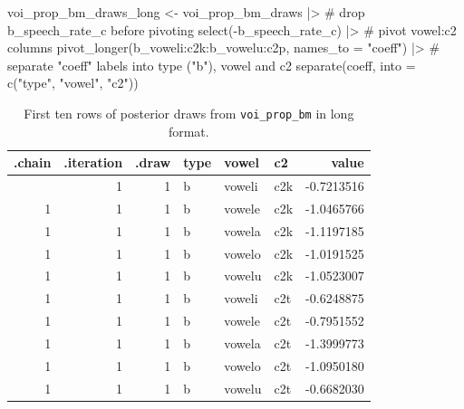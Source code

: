 \documentclass[
  authoryear,
  preprint,
  3p]{elsarticle}
\newenvironment{Shaded}{\begin{snugshade}}{\end{snugshade}}
\newcommand{\AttributeTok}[1]{\textcolor[rgb]{0.40,0.45,0.13}{#1}}
\newcommand{\CommentTok}[1]{\textcolor[rgb]{0.37,0.37,0.37}{#1}}
\newcommand{\FunctionTok}[1]{\textcolor[rgb]{0.28,0.35,0.67}{#1}}
\newcommand{\NormalTok}[1]{\textcolor[rgb]{0.00,0.23,0.31}{#1}}
\newcommand{\OtherTok}[1]{\textcolor[rgb]{0.00,0.23,0.31}{#1}}
\newcommand{\SpecialCharTok}[1]{\textcolor[rgb]{0.37,0.37,0.37}{#1}}
\newcommand{\StringTok}[1]{\textcolor[rgb]{0.13,0.47,0.30}{#1}}
\begin{document}
\begin{Shaded}
\begin{Highlighting}[]
\NormalTok{voi\_prop\_bm\_draws\_long }\OtherTok{\textless{}{-}}\NormalTok{ voi\_prop\_bm\_draws }\SpecialCharTok{|\textgreater{}} 
  \CommentTok{\# drop b\_speech\_rate\_c before pivoting}
  \FunctionTok{select}\NormalTok{(}\SpecialCharTok{{-}}\NormalTok{b\_speech\_rate\_c) }\SpecialCharTok{|\textgreater{}} 
  \CommentTok{\# pivot vowel:c2 columns}
  \FunctionTok{pivot\_longer}\NormalTok{(}\StringTok{\textasciigrave{}}\AttributeTok{b\_voweli:c2k}\StringTok{\textasciigrave{}}\SpecialCharTok{:}\StringTok{\textasciigrave{}}\AttributeTok{b\_vowelu:c2p}\StringTok{\textasciigrave{}}\NormalTok{, }\AttributeTok{names\_to =} \StringTok{"coeff"}\NormalTok{) }\SpecialCharTok{|\textgreater{}} 
  \CommentTok{\# separate "coeff" labels into type ("b"), vowel and c2}
  \FunctionTok{separate}\NormalTok{(coeff, }\AttributeTok{into =} \FunctionTok{c}\NormalTok{(}\StringTok{"type"}\NormalTok{, }\StringTok{"vowel"}\NormalTok{, }\StringTok{"c2"}\NormalTok{))}
\end{Highlighting}
\end{Shaded}

\begin{longtable}[]{@{}rrrlllr@{}}

\caption{\label{tbl-voi-long}First ten rows of posterior draws from
\texttt{voi\_prop\_bm} in long format.}

\tabularnewline

\toprule\noalign{}
.chain & .iteration & .draw & type & vowel & c2 & value \\
\midrule\noalign{}
\endhead
\bottomrule\noalign{}
\endlastfoot
1 & 1 & 1 & b & voweli & c2k & -0.7213516 \\
1 & 1 & 1 & b & vowele & c2k & -1.0465766 \\
1 & 1 & 1 & b & vowela & c2k & -1.1197185 \\
1 & 1 & 1 & b & vowelo & c2k & -1.0191525 \\
1 & 1 & 1 & b & vowelu & c2k & -1.0523007 \\
1 & 1 & 1 & b & voweli & c2t & -0.6248875 \\
1 & 1 & 1 & b & vowele & c2t & -0.7951552 \\
1 & 1 & 1 & b & vowela & c2t & -1.3999773 \\
1 & 1 & 1 & b & vowelo & c2t & -1.0950180 \\
1 & 1 & 1 & b & vowelu & c2t & -0.6682030 \\

\end{longtable}
\end{document}

